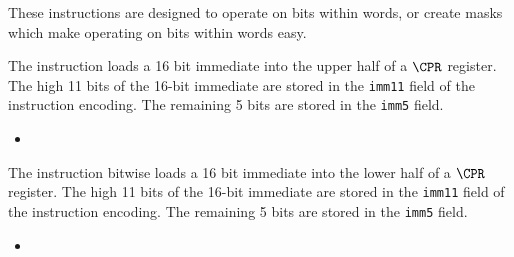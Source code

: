 These instructions are designed to operate on bits within words, or
create masks which make operating on bits within words easy.

{\iencluicr}
{
The  instruction loads a 16 bit immediate into the
upper half of a $\CPR$ register.
The high 11 bits of the 16-bit immediate are stored in the {\tt imm11}
field of the instruction encoding. The remaining 5 bits are stored
in the {\tt imm5} field.
}{
\begin{itemize}
\item {}
\end{itemize}
}{}


{\iencllicr}
{
The  instruction bitwise loads a 16 bit immediate into the
lower half of a $\CPR$ register. 
The high 11 bits of the 16-bit immediate are stored in the {\tt imm11}
field of the instruction encoding. The remaining 5 bits are stored
in the {\tt imm5} field.
}{
\begin{itemize}
\item {}
\end{itemize}
}{}

